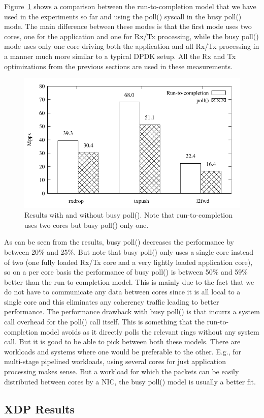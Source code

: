 \documentclass[9pt,numbers,reprint]{sigplanconf}
\begin{document}
Figure~\ref{fig:results_poll} shows a comparison between the
run-to-completion model that we have used in the experiments so far
and using the poll() syscall in the busy poll() mode. The main
difference between these modes is that the first mode uses two cores,
one for the application and one for Rx/Tx processing, while the busy
poll() mode uses only one core driving both the application and all
Rx/Tx processing in a manner much more similar to a typical DPDK
setup. All the Rx and Tx optimizations from the previous sections are
used in these measurements.

\begin{figure}[ht]
\centering
\includegraphics[width=.5\textwidth]{results_poll.pdf}
\caption{Results with and without busy poll(). Note that
  run-to-completion uses two cores but busy poll() only one.}
\label{fig:results_poll}
\end{figure}

As can be seen from the results, busy poll() decreases the performance
by between 20\% and 25\%. But note that busy poll() only uses a single
core instead of two (one fully loaded Rx/Tx core and a very lightly
loaded application core), so on a per core basis the performance of
busy poll() is between 50\% and 59\% better than the run-to-completion
model. This is mainly due to the fact that we do not have to
communicate any data between cores since it is all local to a single
core and this eliminates any coherency traffic leading to better
performance. The performance drawback with busy poll() is that incurrs
a system call overhead for the poll() call itself. This is something
that the run-to-completion model avoids as it directly polls the
relevant rings without any system call. But it is good to
be able to pick between both these models. There are workloads and
systems where one would be preferable to the other. E.g., for
multi-stage pipelined workloads, using several cores for just
application processing makes sense. But a workload for which the
packets can be easily distributed between cores by a NIC, the
busy poll() model is usually a better fit.


\subsection{XDP Results}
\label{sec:exp:xdpres}
\end{document}
